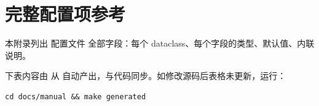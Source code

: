
\chapter{完整配置项参考}

本附录列出 \openbench{} 配置文件  全部字段：每个 dataclass、每个字段的类型、默认值、内联说明。

下表内容由  从  自动产出，与代码同步。如修改源码后表格未更新，运行：

\begin{verbatim}
cd docs/manual && make generated
\end{verbatim}


